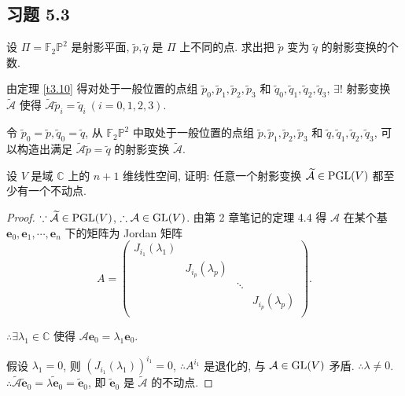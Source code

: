 \documentclass{ctexart}
\begin{document}
\subsection{习题 5.3}
\begin{exercise}%
    设 $\varPi=\mathbb{F}_2\mathbb{P}^2$ 是射影平面, $\tilde{p},\tilde{q}$ 是 $\varPi$ 上不同的点. 求出把 $\tilde{p}$ 变为 $\tilde{q}$ 的射影变换的个数.
\end{exercise}
\begin{solution}
    由定理 \ref{t3.10} 得对处于一般位置的点组 $\tilde{p}_0,\tilde{p}_1,\tilde{p}_2,\tilde{p}_3$ 和 $\tilde{q}_0,\tilde{q}_1,\tilde{q}_2,\tilde{q}_3$, $\exists!$ 射影变换 $\widetilde{\mathcal{A}}$ 使得 $\widetilde{\mathcal{A}}\tilde{p}_i=\tilde{q}_i\ (i=0,1,2,3)$.

    令 $\tilde{p}_0=\tilde{p},\tilde{q}_0=\tilde{q}$, 从 $\mathbb{F}_2\mathbb{P}^2$ 中取处于一般位置的点组 $\tilde{p},\tilde{p}_1,\tilde{p}_2,\tilde{p}_3$ 和 $\tilde{q},\tilde{q}_1,\tilde{q}_2,\tilde{q}_3$, 可以构造出满足 $\widetilde{\mathcal{A}}\tilde{p}=\tilde{q}$ 的射影变换 $\widetilde{\mathcal{A}}$.
\end{solution}
\begin{exercise}%
    设 $V$ 是域 $\mathbb{C}$ 上的 $n+1$ 维线性空间, 证明: 任意一个射影变换 $\widetilde{\mathcal{A}}\in\operatorname{PGL} (V)$ 都至少有一个不动点.
\end{exercise}
\begin{proof}
    $\because\widetilde{\mathcal{A}}\in\operatorname{PGL} (V)$, $\therefore\mathcal{A}\in\operatorname{GL} (V)$. 由第 2 章笔记的定理 4.4 得 $\mathcal{A}$ 在某个基 $\boldsymbol{e}_0,\boldsymbol{e}_1,\cdots,\boldsymbol{e}_n$ 下的矩阵为 Jordan 矩阵
    \[A=\begin{pmatrix}
        J_{i_1}(\lambda_1) \\
        & J_{i_p}(\lambda_p) \\
        && \ddots \\
        &&& J_{i_p}(\lambda_p) \\
    \end{pmatrix}.\]
    
    $\therefore\exists\lambda_1\in\mathbb{C}$ 使得 $\mathcal{A}\boldsymbol{e}_0=\lambda_1\boldsymbol{e}_0$.

    假设 $\lambda_1=0$, 则 $(J_{i_1}(\lambda_1))^{i_1}=0$, $\therefore A^{i_1}$ 是退化的, 与 $\mathcal{A}\in\operatorname{GL} (V)$ 矛盾. $\therefore\lambda\neq0$. $\therefore\widetilde{\mathcal{A}}\tilde{\boldsymbol{e}}_0=\widetilde{\lambda\boldsymbol{e}_0}=\tilde{\boldsymbol{e}}_0$, 即 $\tilde{\boldsymbol{e}}_0$ 是 $\widetilde{\mathcal{A}}$ 的不动点.
\end{proof}
\end{document}

